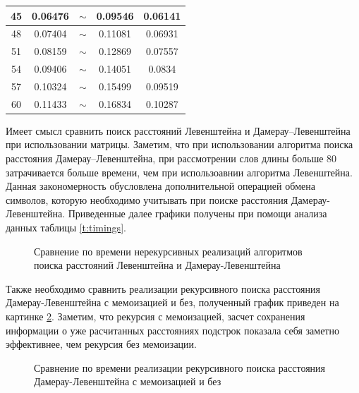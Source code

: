 \begin{table}[!ht]
\begin{tabular}{|c|c|c|c|c|}
	45 & 0.06476            & $\sim$                & 0.09546                     & 0.06141                \\ \hline
	48 & 0.07404            & $\sim$                & 0.11081                     & 0.06931                \\ \hline
	51 & 0.08159            & $\sim$                & 0.12869                     & 0.07557                \\ \hline
	54 & 0.09406            & $\sim$                & 0.14051                     & 0.0834                 \\ \hline
	57 & 0.10324            & $\sim$                & 0.15499                     & 0.09519                \\ \hline
	60 & 0.11433            & $\sim$                & 0.16834                     & 0.10287                \\ \hline
	\end{tabular}
\end{table}



Имеет смысл сравнить поиск расстояний Левенштейна и Дамерау--Левенштейна при использовании матрицы. Заметим, что при использовании
алгоритма поиска расстояния Дамерау--Левенштейна, при рассмотрении слов длины больше 80 затрачивается больше времени, чем 
при использоавнии алгоритма Левенштейна. Данная закономерность обусловлена дополнительной операцией обмена символов, которую 
необходимо учитывать при поиске расстояния Дамерау-Левенштейна. Приведенные далее графики  получены при 
помощи анализа данных таблицы \ref{t:timings}.

\begin{figure}[H]
	\centering
	
	\caption{Сравнение по времени нерекурсивных реализаций алгоритмов поиска расстояний Левенштейна и Дамерау-Левенштейна}
	\label{plt:time_matrix_cmp}
\end{figure}

Также необходимо сравнить реализации рекурсивного поиска расстояния Дамерау-Левенштейна с мемоизацией и без, полученный график приведен
на картинке \ref{plt:time_rec_cmp}. Заметим, что рекурсия с мемоизацией, засчет сохранения информации о уже расчитанных расстояниях подстрок
показала себя заметно эффективнее, чем рекурсия без мемоизации. 


\begin{figure}[H]
	\centering
	
	\caption{Сравнение по времени реализации рекурсивного поиска расстояния Дамерау-Левенштейна с мемоизацией и без}
	\label{plt:time_rec_cmp}
\end{figure}

